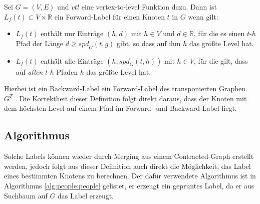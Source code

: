 \begin{definition}
  Sei $G = (V, E)$ und ${vtl}$ eine vertex-to-level Funktion dazu.
  Dann ist $L_f (t) \subset V \times \mathbb{R}$ ein Forward-Label für einen Knoten $t$ in $G$ wenn gilt:

  \begin{itemize}
    \item
          $L_f (t)$ enthält nur Einträge $(h, d)$ mit $h \in V$ und $d \in \mathbb{R}$, für die es einen $t$-$h$ Pfad der Länge $d \geq {spd}_G (t, g)$ gibt, so dass auf ihm $h$ das größte Level hat.

    \item
          $L_f (t)$ enthält alle Einträge $(h, {spd}_G (t, h))$ mit $h \in V$, für die gilt, dass auf \emph{allen} $t$-$h$ Pfaden $h$ das größte Level hat.
  \end{itemize}
\end{definition}


Hierbei ist ein Backward-Label ein Forward-Label des transponierten Graphen $G^T$ .
Die Korrektheit dieser Definition folgt direkt daraus, dass der Knoten mit dem höchsten Level auf einem Pfad im Forward- und Backward-Label liegt.

\subsection{Algorithmus}

Solche Labels können wieder durch Merging aus einem Contracted-Graph erstellt werden, jedoch folgt aus dieser Definition auch direkt die Möglichkeit, das Label eines bestimmten Knotens zu berechnen.
Der dafür verwendete Algorithmus ist in Algorithmus \ref{alg:people:people} gelistet, er erzeugt ein gepruntes Label, da er aus Suchbaum auf $G$ das Label erzeugt.

